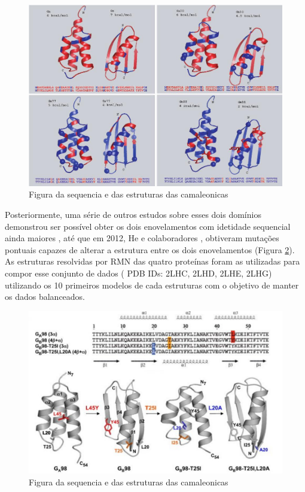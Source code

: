 \begin{figure}
  \centering
  \includegraphics[width=1.0\textwidth]{figures/ga_gb.jpg}
  \caption{Figura da sequencia e das estruturas das camaleonicas}
        \label{fig:ga_gb}
\end{figure}

Posteriormente, uma série de outros estudos sobre esses dois domínios demonstrou ser possível obter os dois enovelamentos com idetidade sequencial ainda maiores \cite{10.1073/pnas.0805857105, 10.1073/pnas.0906408106},  até que em 2012, He e colaboradores \cite{10.1016/j.str.2011.11.018}, obtiveram mutações pontuais capazes de alterar a estrutura entre os dois enovelamentos (Figura \ref{fig:camaleonicas}). As estruturas resolvidas por RMN das quatro proteínas foram as utilizadas para compor esse conjunto de dados ( PDB IDs: 2LHC, 2LHD, 2LHE, 2LHG) utilizando os 10 primeiros modelos de cada estruturas com o objetivo de manter os dados balanceados.

\begin{figure}
	\centering
	\includegraphics[width=1.0\textwidth]{figures/chameleonic_resume.pdf}
	\caption{Figura da sequencia e das estruturas das camaleonicas}
        \label{fig:camaleonicas}
\end{figure}

